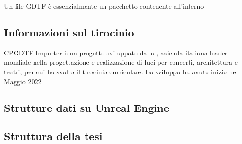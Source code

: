 \documentclass[main.tex]{subfiles}
\begin{document}
Un file GDTF è essenzialmente un pacchetto contenente all'interno 

\subsection{Informazioni sul tirocinio}\label{subsec:1_tirocinio}
CPGDTF-Importer è un progetto sviluppato dalla , azienda italiana leader mondiale nella progettazione e realizzazione di luci per concerti, architettura e teatri, per cui ho svolto il tirocinio curriculare. Lo sviluppo ha avuto inizio nel Maggio 2022 

\subsection{Strutture dati su Unreal Engine}\label{subsec:1_dataStructsUE}

\subsection{Struttura della tesi}\label{subsec:1_thesisInfo}
\end{document}
